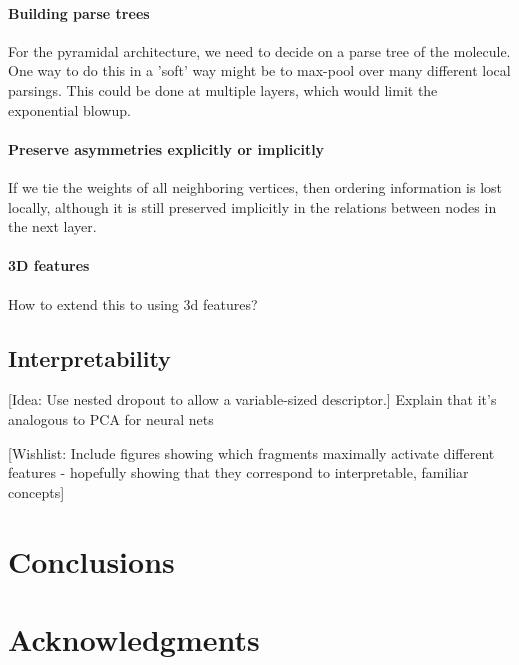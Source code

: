 \documentclass{article}
\begin{document}
\paragraph{Building parse trees}
For the pyramidal architecture, we need to decide on a parse tree of the molecule.
One way to do this in a 'soft' way might be to max-pool over many different local parsings.
This could be done at multiple layers, which would limit the exponential blowup.

\paragraph{Preserve asymmetries explicitly or implicitly}
If we tie the weights of all neighboring vertices, then ordering information is lost locally, although it is still preserved implicitly in the relations between nodes in the next layer.

\paragraph{3D features}
How to extend this to using 3d features?

\subsection{Interpretability}
[Idea: Use nested dropout to allow a variable-sized descriptor.]
Explain that it's analogous to PCA for neural nets

[Wishlist: Include figures showing which fragments maximally activate different features - hopefully showing that they correspond to interpretable, familiar concepts]

\section{Conclusions}


\section*{Acknowledgments}





\end{document}
